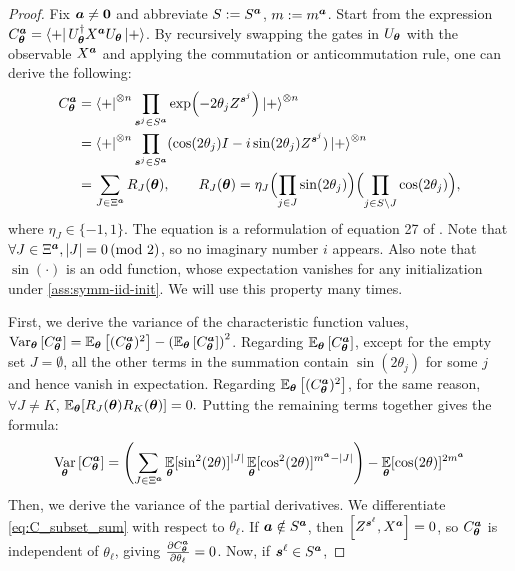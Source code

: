 \documentclass{article}
\theoremstyle{plain}
\theoremstyle{definition}
\theoremstyle{remark}
\begin{document}
\begin{proof}
Fix ${\bm{a}}\neq \mathbf 0$ and abbreviate $S:=S^{\bm{a}}$, $m:=m^{\bm{a}}$. Start from the expression $C^{\bm{a}}_{\bm{\theta}}=\bra{+} U_{\bm{\theta}}^\dagger X^{{\bm{a}}}U_{\bm{\theta}}\ket{+}
$. By recursively swapping the gates in $U_{\bm{\theta}}$ with the observable $X^{{\bm{a}}}$ and applying the commutation or anticommutation rule, one can derive the following:
\begin{align}
C^{\bm{a}}_{\bm{\theta}}
&= \bra{+}^{\otimes n} \prod_{{\bm{s}^j}\in S^{\bm{a}}} \exp(-2\theta_jZ^{\bm{s}^j}) \ket{+}^{\otimes n} \\
&= \bra{+}^{\otimes n} \prod_{{\bm{s}^j}\in S^{\bm{a}}} (\cos(2\theta_j)I - i \sin(2\theta_j)Z^{\bm{s}^j}) \ket{+}^{\otimes n}  \\
&= \sum_{J\in\Xi^{\bm{a}}} R_J({\bm{\theta}}), \qquad R_J({\bm{\theta}})=\eta_J 
\Bigl(\prod_{j\in J} \sin(2\theta_j)\Bigr)\Bigl(\prod_{j\in S\setminus J}\cos(2\theta_j)\Bigr),
\label{eq:C_subset_sum}
\end{align}
where $\eta_J \in \{-1,1\}$. The equation is a reformulation of equation 27 of \cite{recioarmengol25}. Note that $\forall J \in \Xi^{\bm{a}}, \abs{J} = 0 \, (\text{mod 2})$, so no imaginary number $i$ appears. Also note that $\sin(\cdot)$ is an odd function, whose expectation vanishes for any initialization under \cref{ass:symm-iid-init}. We will use this property many times.

First, we derive the variance of the characteristic function values, $\operatorname*{Var}_{\bm{\theta}} \left[ C^{\bm{a}}_{\bm{\theta}} \right] = \operatorname*{\mathbb{E}}_{\bm{\theta}} \left[ (C^{\bm{a}}_{\bm{\theta}})^2\right] - \left(\operatorname*{\mathbb{E}}_{\bm{\theta}} \left[ C^{\bm{a}}_{\bm{\theta}} \right]\right)^2$. Regarding $\operatorname*{\mathbb{E}}_{\bm{\theta}} \left[ C^{\bm{a}}_{\bm{\theta}} \right]$, except for the empty set $J = \emptyset$, all the other terms in the summation contain $\sin(2\theta_j)$ for some $j$ and hence vanish in expectation. Regarding $\operatorname*{\mathbb{E}}_{\bm{\theta}} \left[ (C^{\bm{a}}_{\bm{\theta}})^2\right]$, for the same reason, $\forall J \neq K$,  $\operatorname*{\mathbb{E}}_{{\bm{\theta}}}[R_J({\bm{\theta}})R_K({\bm{\theta}})] = 0.$ Putting the remaining terms together gives the formula:
\begin{equation}
\label{eq: symmetric cost variance}
     \operatorname*{Var}_{\bm{\theta}} \left[ C^{\bm{a}}_{\bm{\theta}} \right] = \left(\sum_{J \in \Xi^{\bm{a}}} \operatorname*{\mathbb{E}}_{{\bm{\theta}}}[\sin^2(2\theta)]^\abs{J} \operatorname*{\mathbb{E}}_{{\bm{\theta}}}[\cos^2(2\theta)]^{m^{\bm{a}}-\abs{J}}\right) - \operatorname*{\mathbb{E}}_{{\bm{\theta}}}[\cos(2\theta)]^{2m^{\bm{a}}}
\end{equation}
Then, we derive the variance of the partial derivatives. We differentiate \cref{eq:C_subset_sum} with respect to $\theta_\ell$. If ${\bm{a}} \notin S^{\bm{a}}$, then $\comm{Z^{\vts^\ell}}{X^\vta}=0$, so $C^{\bm{a}}_{\bm{\theta}}$ is independent of $\theta_\ell$, giving $\frac{\partial C^{\bm{a}}_{\bm{\theta}}}{\partial \theta_\ell}=0$. Now, if ${\bm{s}^\ell} \in S^{\bm{a}}$,


\end{proof}
\end{document}
